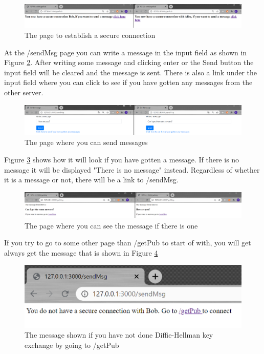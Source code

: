 \documentclass[12pt, letterpaper]{article}
\begin{document}
\begin{figure}[H]
  \hspace*{-50px}\includegraphics[width=500px]{code_snippets/getpubpage.PNG}
  \caption{The page to establish a secure connection}
  \label{fig:getpubpage}
\end{figure}

At the /sendMsg page you can write a message in the input field as shown in Figure \ref{fig:sendmsgpage}. After writing some message and clicking enter or the Send button the input field will be cleared and the message is sent. There is also a link under the input field where you can click to see if you have gotten any messages from the other server.

\begin{figure}[H]
  \hspace*{-50px}\includegraphics[width=500px]{code_snippets/sendmsgpage.PNG}
  \caption{The page where you can send messages}
  \label{fig:sendmsgpage}
\end{figure}

Figure \ref{fig:getmsg} shows how it will look if you have gotten a message. If there is no message it will be displayed "There is no message" instead. Regardless of whether it is a message or not, there will be a link to /sendMsg. 

\begin{figure}[H]
  \hspace*{-50px}\includegraphics[width=500px]{code_snippets/getmsgpage.PNG}
  \caption{The page where you can see the message if there is one}
  \label{fig:getmsg}
\end{figure}

If you try to go to some other page than /getPub to start of with, you will get always get the message that is shown in Figure \ref{fig:notsecure}

\begin{figure}[H]
  \includegraphics[width=\linewidth]{code_snippets/notsecure.PNG}
  \caption{The message shown if you have not done Diffie-Hellman key exchange by going to /getPub}
  \label{fig:notsecure}
\end{figure}
\end{document}
